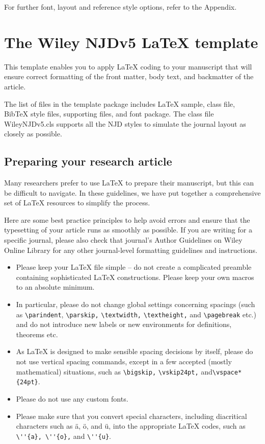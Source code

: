 \documentclass[11pt]{article}
\begin{document}
\noindent For further font, layout and reference style options, refer to the Appendix.

\section{The Wiley NJDv5 LaTeX template}
\label{sec3}

This template enables you to apply LaTeX coding to your manuscript that will ensure correct formatting of the front matter, body text, and backmatter of the article.

The list of f{i}les in the template package includes LaTeX sample, class f{i}le, BibTeX style f{i}les, supporting f{i}les, and font package. The class f{i}le WileyNJDv5.cls supports all the NJD styles to simulate the journal layout as closely as possible.


\subsection{Preparing your research article}

Many researchers prefer to use LaTeX to prepare their manuscript, but this can be diff{i}cult to navigate.
In these guidelines, we have put together a comprehensive set of LaTeX resources to simplify the process.

Here are some best practice principles to help avoid errors and ensure that the typesetting of your article runs as smoothly as possible.
If you are writing for a specif{i}c journal, please also check that journal's Author Guidelines on Wiley Online Library for any other journal-level formatting guidelines and instructions.


\begin{itemize}
\item Please keep your LaTeX f{i}le simple -- do not create a complicated preamble containing sophisticated LaTeX constructions.
Please keep your own macros to an absolute minimum.
\item In particular, please do not change global settings concerning spacings (such as \verb|\parindent|, \verb|\parskip,| \verb|\textwidth,| \verb|\textheight,| and \verb|\pagebreak| etc.) and
 do not introduce new labels or new environments for def{i}nitions, theorems etc.
\item As LaTeX is designed to make sensible spacing
decisions by itself, please do not use vertical spacing commands, except in a few accepted (mostly
mathematical) situations, such as \verb|\bigskip,| \verb|\vskip24pt,| and\break \verb|\vspace*{24pt}|.
\item Please do not use any custom fonts.
\item Please make sure that you convert special characters, including diacritical characters such as ä, ö, and ü, into the appropriate LaTeX codes,
such as \verb|\''{a}, \''{o},| and \verb|\''{u}|.
\end{itemize}
\end{document}
